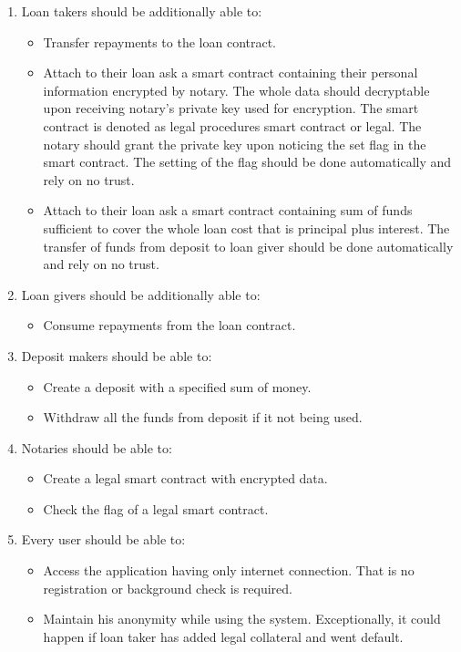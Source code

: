 \documentclass[a4paper,12pt,twoside,openany]{report}
\begin{document}
\begin{enumerate}
\item Loan takers should be additionally able to:
\begin{itemize}
\item Transfer repayments to the loan contract.
\item Attach to their loan ask a smart contract containing their personal information encrypted by notary. The whole data should decryptable upon receiving notary's private key used for encryption. The smart contract is denoted as legal procedures smart contract or legal. The notary should grant the private key upon noticing the set flag in the smart contract. The setting of the flag should be done automatically and rely on no trust.
\item Attach to their loan ask a smart contract containing sum of funds sufficient to cover the whole loan cost that is principal plus interest. The transfer of funds from deposit to loan giver should be done automatically and rely on no trust.
\end{itemize}

\item Loan givers should be additionally able to:
\begin{itemize}
\item Consume repayments from the loan contract.
\end{itemize}

\item Deposit makers should be able to:
\begin{itemize}
\item Create a deposit with a specified sum of money.
\item Withdraw all the funds from deposit if it not being used.
\end{itemize}

\item Notaries should be able to:
\begin{itemize}
\item Create a legal smart contract with encrypted data.
\item Check the flag of a legal smart contract.
\end{itemize}

\item Every user should be able to:
\begin{itemize}
\item Access the application having only internet connection. That is no registration or background check is required.
\item Maintain his anonymity while using the system. Exceptionally, it could happen if loan taker has added legal collateral and went default.
\end{itemize}
\end{enumerate}
\end{document}
